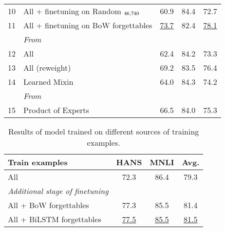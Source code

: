 \begin{table*}[ht]
\begin{tabular}{llccc}
\small{10} & \hspace{0.1cm} All + finetuning on Random $_{46,740}$       & 60.9                     & 84.4                         & 72.7  \\
\small{11} & All + finetuning on BoW forgettables    & \underline{73.7}                     & 82.4             & \underline{78.1} \\
\midrule
&\emph{From~\cite{clark2019dont}} & & & \\
\small{12} & All & 62.4 & 84.2 & 73.3 \\
\small{13} & All (reweight) & 69.2 & 83.5 & 76.4 \\
\small{14} & Learned Mixin & 64.0 & 84.3 & 74.2\\
\midrule
&\emph{From~\cite{mahabadi2019simple}} & & &  \\
\small{15} & Product of Experts & 66.5 & 84.0 & 75.3     \\
\bottomrule
\end{tabular}
\end{table*}

\begin{table}[ht]
\caption{Results of \bertlarge model trained on different sources of training examples.}
\small
\label{tab:bertlarge}
\centering
\begin{tabular}{lccc}
\toprule
\textbf{Train examples} & \textbf{HANS} & \textbf{MNLI} & \textbf{Avg.}  \\
\midrule
All & 72.3 & 86.4 &  79.3 \\
\midrule
\emph{Additional stage of finetuning} & & &\\
All + BoW forgettables & 77.3 & 85.5 & 81.4 \\
All + BiLSTM forgettables & \underline{77.5} & \underline{85.5} & \underline{81.5} \\
\bottomrule
\end{tabular}
\end{table}

